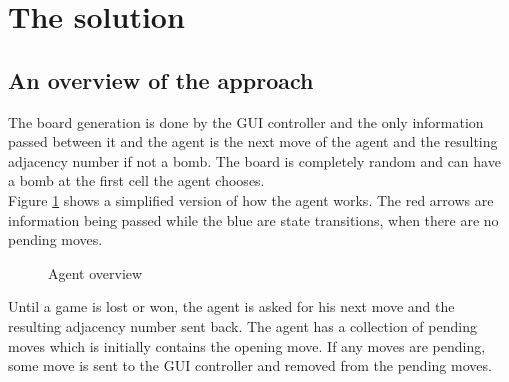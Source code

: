 \documentclass[11pt,a4paper,notitlepage]{article}
\theoremstyle{definition}
\begin{document}
\section{The solution}
\subsection{An overview of the approach}
The board generation is done by the GUI controller and the only information passed between it and the agent is the next move of the agent and the resulting adjacency number if not a bomb. The board is completely random and can have a bomb at the first cell the agent chooses.\\

Figure \ref{fig:aov} shows a simplified version of how the agent works. The red arrows are information being passed while the blue are state transitions, when there are no pending moves. 

\begin{figure}[H]
\begin{center}
\end{center}
\caption{Agent overview}
\label{fig:aov}
\end{figure}

Until a game is lost or won, the agent is asked for his next move and the resulting adjacency number sent back. The agent has a collection of pending moves which is initially contains the opening move. If any moves are pending, some move is sent to the GUI controller and removed from the pending moves.\\
\end{document}
